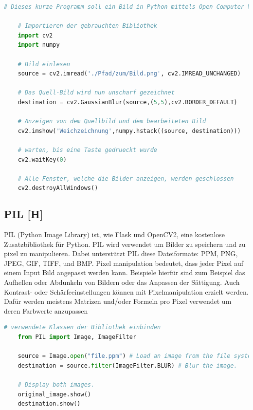 \begin{lstlisting}[language=Python,caption=OpenCV Demo,label=lst:tech:gaussianBlur]
    # Dieses kurze Programm soll ein Bild in Python mittels Open Computer Vision weichzeichnen
    
    # Importieren der gebrauchten Bibliothek
    import cv2
    import numpy
    
    # Bild einlesen
    source = cv2.imread('./Pfad/zum/Bild.png', cv2.IMREAD_UNCHANGED)
    
    # Das Quell-Bild wird nun unscharf gezeichnet
    destination = cv2.GaussianBlur(source,(5,5),cv2.BORDER_DEFAULT)

    # Anzeigen von dem Quellbild und dem bearbeiteten Bild 
    cv2.imshow('Weichzeichnung',numpy.hstack((source, destination)))

    # warten, bis eine Taste gedrueckt wurde
    cv2.waitKey(0) 

    # Alle Fenster, welche die Bilder anzeigen, werden geschlossen
    cv2.destroyAllWindows() 
\end{lstlisting}

\subsection{PIL [H]}
PIL (Python Image Library) ist, wie Flask und OpenCV2, eine kostenlose Zusatzbibliothek für Python.
PIL wird verwendet um Bilder zu speichern und zu pixel zu manipulieren. Dabei unterstützt PIL diese
Dateiformate: PPM, PNG, JPEG, GIF, TIFF, und BMP. Pixel manipulation bedeutet, dass jeder Pixel auf einem
Input Bild angepasst werden kann. Beispiele hierfür sind zum Beispiel das Aufhellen oder Abdunkeln von
Bildern oder das Anpassen der Sättigung. Auch Kontrast- oder Schärfeeinstellungen können mit
Pixelmanipulation erzielt werden. Dafür werden meistens Matrizen und/oder Formeln pro Pixel verwendet um
deren Farbwerte anzupassen
\\



\begin{lstlisting}[language=Python,caption=PIL Demo,label=lst:tech:PIL]
    # verwendete Klassen der Bibliothek einbinden
    from PIL import Image, ImageFilter  

    source = Image.open("file.ppm") # Load an image from the file system.
    destination = source.filter(ImageFilter.BLUR) # Blur the image.

    # Display both images.
    original_image.show() 
    destination.show()
\end{lstlisting}



